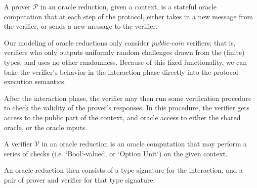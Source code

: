 \begin{definition}
    \label{def:prover_type_signature}
    A prover $\mathcal{P}$ in an oracle reduction, given a context, is a stateful oracle computation
    that at each step of the protocol, either takes in a new message from the verifier, or sends a
    new message to the verifier.
\end{definition}

Our modeling of oracle reductions only consider \emph{public-coin} verifiers; that is, verifiers who
only outputs uniformly random challenges drawn from the (finite) types, and uses no other
randomness. Because of this fixed functionality, we can bake the verifier's behavior in the
interaction phase directly into the protocol execution semantics.

After the interaction phase, the verifier may then run some verification procedure to check the
validity of the prover's responses. In this procedure, the verifier gets access to the public part
of the context, and oracle access to either the shared oracle, or the oracle inputs.

\begin{definition}
    \label{def:verifier_type_signature}
    A verifier $\mathcal{V}$ in an oracle reduction is an oracle computation that may perform a
    series of checks (i.e. `Bool`-valued, or `Option Unit`) on the given context.
\end{definition}


An oracle reduction then consists of a type signature for the interaction, and a pair of prover and
verifier for that type signature.



